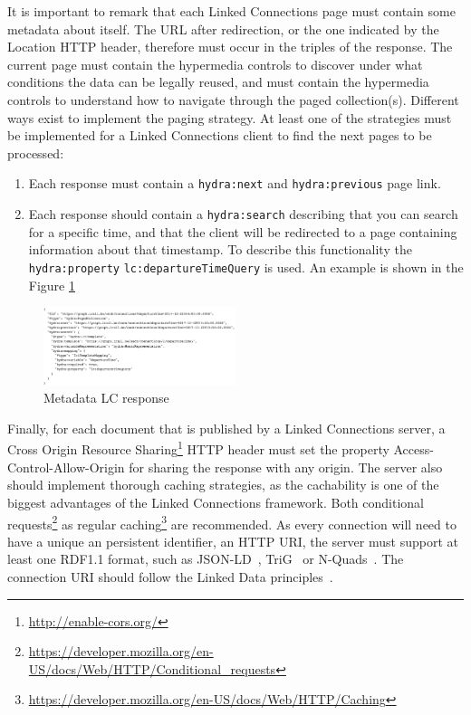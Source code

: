 \documentclass[sw]{iosart2x}
\begin{document}
	It is important to remark that each Linked Connections page must contain some metadata about itself. The URL after redirection, or the one indicated by the Location HTTP header, therefore must occur in the triples of the response. The current page must contain the hypermedia controls to discover under what conditions the data can be legally reused, and must contain the hypermedia controls to understand how to navigate through the paged collection(s). Different ways exist to implement the paging strategy. At least one of the strategies must be implemented for a Linked Connections client to find the next pages to be processed:
	\begin{enumerate}
	\item Each response must contain a \texttt{hydra:next} and \texttt{hydra:previous} page link.
	\item Each response should contain a \texttt{hydra:search} describing that you can search for a specific time, and that the client will be redirected to a page containing information about that timestamp. To describe this functionality the \texttt{hydra:property} \texttt{lc:departureTimeQuery} is used. An example is shown in the Figure \ref{fig:metadata}
	\end{enumerate}
	
	\begin{figure}[t]
		\includegraphics[width=0.5\textwidth]{images/search.png}
		\caption{Metadata LC response}\label{fig:metadata}
	\end{figure}
	
	Finally, for each document that is published by a Linked Connections server, a Cross Origin Resource Sharing\footnote{\url{http://enable-cors.org/}} HTTP header must set the property Access-Control-Allow-Origin for sharing the response with any origin. The server also should implement thorough caching strategies, as the cachability is one of the biggest advantages of the Linked Connections framework. Both conditional requests\footnote{\url{https://developer.mozilla.org/en-US/docs/Web/HTTP/Conditional_requests}} as regular caching\footnote{\url{https://developer.mozilla.org/en-US/docs/Web/HTTP/Caching}} are recommended. As every connection will need to have a unique an persistent identifier, an HTTP URI, the server must support at least one RDF1.1 format, such as JSON-LD~\cite{world2014json}, TriG~\cite{bizer2014rdf} or N-Quads~\cite{cyganiak2008n}. The connection URI should follow the Linked Data principles~\cite{bizer2009linked}.
	
\end{document}
